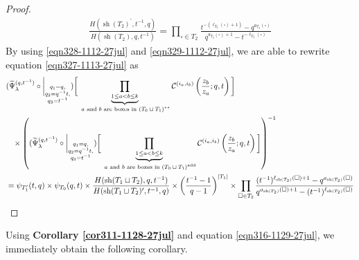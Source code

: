 \documentclass[12pt,reqno,a4paper]{amsart}
\newcommand{\comp}{\circ}
\newcommand{\cals}[1]{\mathcal{#1}}
\numberwithin{equation}{section}
\theoremstyle{definition}
\begin{document}
\begin{proof}
\begin{align}
	\frac{
		H(\operatorname{sh}(T_2)^\prime,t^{-1},q)
	}{
		H(\operatorname{sh}(T_2),q,t^{-1})
	}
	=
	\prod_{\square \in T_2}
	\frac{
		t^{-(\ell_{T_2}(\square) + 1)} - q^{a_{T_2}(\square)}
	}{
		q^{a_{T_2}(\square) + 1} - t^{-\ell_{T_2}(\square)}
	} 
\label{eqn329-1112-27jul}
\end{align}
By using \eqref{eqn328-1112-27jul} and \eqref{eqn329-1112-27jul}, we are able to rewrite equation \eqref{eqn327-1113-27jul} as 
\footnotesize
\begin{align}
	&
	(
	\widetilde{\Psi}_{\lambda}^{(q,t^{-1})}
	\comp 
	\bigg|_{
		\substack{
			q_1 = q, \\
			q_2 = q^{-1}t,\\
			q_3 = t^{-1} \\
		}
	}
	)
	\bigg[
	\underbrace{	\prod_{1 \leq a < b \leq k}				}_{\text{ $a$ and $b$ are boxes in $(T_0 \sqcup T_1)^{\star\star}$}}
	\cals{C}^{(i_a,i_b)}\left(
	\frac{z_b}{z_a}
	; q, t
	\right)
	\bigg]
	\\
	&\hspace{0.3cm}\times
	\left(
	(
	\widetilde{\Psi}_{\lambda}^{(q,t^{-1})}
	\comp 
	\bigg|_{
		\substack{
			q_1 = q, \\
			q_2 = q^{-1}t,\\
			q_3 = t^{-1} \\
		}
	}
	)
	\bigg[
	\underbrace{	\prod_{1 \leq a < b \leq k}				}_{\text{ $a$ and $b$ are boxes in $(T_0 \sqcup T_1)^{\operatorname{add}}$}}
	\cals{C}^{(i_a,i_b)}\left(
	\frac{z_b}{z_a}
	; q, t
	\right)
	\bigg]
	\right)^{-1}
	\notag 
	\\
	&=  
	\psi_{T^{\prime}_{1}}(t,q) \times \psi_{T_0}(q,t)
	\times
	\frac{
		H(\operatorname{sh}(T_1 \sqcup T_2),q,t^{-1})
	}{
		H(\operatorname{sh}(T_1 \sqcup T_2)^\prime,t^{-1},q)
	}
	\times
	\left(	\frac{t^{-1} - 1}{q-1}		\right)^{|T_1|}
	\notag 
	\times 
	\prod_{\square \in T_2}
	\frac{
		(t^{-1})^{\ell_{\operatorname{sh}(T_2)}(\square) + 1} - q^{a_{\operatorname{sh}(T_2)}(\square)}
	}{
		q^{a_{\operatorname{sh}(T_2)}(\square) + 1} - (t^{-1})^{\ell_{\operatorname{sh}(T_2)}(\square)}
	}
	\notag 
\end{align}
\normalsize
\end{proof}

Using \textbf{Corollary \ref{cor311-1128-27jul}} and equation \eqref{eqn316-1129-27jul}, we immediately obtain the following corollary. 
\end{document}
